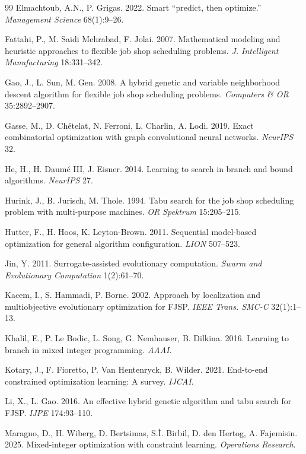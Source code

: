 \documentclass[conference]{IEEEtran}
\begin{document}
\begin{thebibliography}{99}
 Elmachtoub, A.N., P. Grigas. 2022. Smart ``predict, then optimize.'' \textit{Management Science} 68(1):9--26.

 Fattahi, P., M. Saidi Mehrabad, F. Jolai. 2007. Mathematical modeling and heuristic approaches to flexible job shop scheduling problems. \textit{J. Intelligent Manufacturing} 18:331--342.

 Gao, J., L. Sun, M. Gen. 2008. A hybrid genetic and variable neighborhood descent algorithm for flexible job shop scheduling problems. \textit{Computers \& OR} 35:2892--2907.

 Gasse, M., D. Ch\'{e}telat, N. Ferroni, L. Charlin, A. Lodi. 2019. Exact combinatorial optimization with graph convolutional neural networks. \textit{NeurIPS} 32.

 He, H., H. Daum\'{e} III, J. Eisner. 2014. Learning to search in branch and bound algorithms. \textit{NeurIPS} 27.

 Hurink, J., B. Jurisch, M. Thole. 1994. Tabu search for the job shop scheduling problem with multi-purpose machines. \textit{OR Spektrum} 15:205--215.

 Hutter, F., H. Hoos, K. Leyton-Brown. 2011. Sequential model-based optimization for general algorithm configuration. \textit{LION} 507--523.

 Jin, Y. 2011. Surrogate-assisted evolutionary computation. \textit{Swarm and Evolutionary Computation} 1(2):61--70.

 Kacem, I., S. Hammadi, P. Borne. 2002. Approach by localization and multiobjective evolutionary optimization for FJSP. \textit{IEEE Trans. SMC-C} 32(1):1--13.

 Khalil, E., P. Le Bodic, L. Song, G. Nemhauser, B. Dilkina. 2016. Learning to branch in mixed integer programming. \textit{AAAI}.

 Kotary, J., F. Fioretto, P. Van Hentenryck, B. Wilder. 2021. End-to-end constrained optimization learning: A survey. \textit{IJCAI}.

 Li, X., L. Gao. 2016. An effective hybrid genetic algorithm and tabu search for FJSP. \textit{IJPE} 174:93--110.

 Maragno, D., H. Wiberg, D. Bertsimas, S.\.{I}. Birbil, D. den Hertog, A. Fajemisin. 2025. Mixed-integer optimization with constraint learning. \textit{Operations Research}.


\end{thebibliography}
\end{document}

